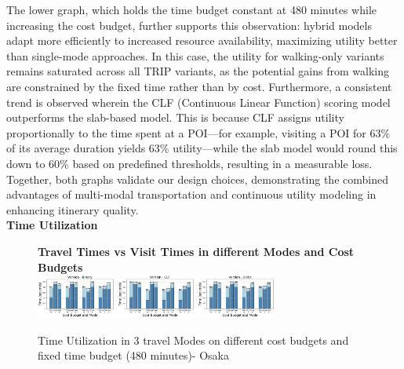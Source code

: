The lower graph, which holds the time budget constant at 480 minutes while increasing the cost budget, further supports this observation: hybrid models adapt more efficiently to increased resource availability, maximizing utility better than single-mode approaches. In this case, the utility for walking-only variants remains saturated across all TRIP variants, as the potential gains from walking are constrained by the fixed time rather than by cost. Furthermore, a consistent trend is observed wherein the CLF (Continuous Linear Function) scoring model outperforms the slab-based model. This is because CLF assigns utility proportionally to the time spent at a POI—for example, visiting a POI for 63\% of its average duration yields 63\% utility—while the slab model would round this down to 60\% based on predefined thresholds, resulting in a measurable loss. Together, both graphs validate our design choices, demonstrating the combined advantages of multi-modal transportation and continuous utility modeling in enhancing itinerary quality.\\

\noindent\textbf{Time Utilization}
\begin{figure}[th]
\textbf{Travel Times vs Visit Times in different Modes and Cost Budgets}\\
\includegraphics[width=0.23\textwidth]{plots/TIME_UTILIZATION_BINARY.png}
\includegraphics[width=0.23\textwidth]{plots/TIME_UTILIZATION_CLF.png}
\includegraphics[width=0.23\textwidth]{plots/TIME_UTILIZATION_SLABS.png}
\hspace{8pt}
\caption{Time Utilization in 3 travel Modes on different cost budgets and fixed time budget (480 minutes)- Osaka}
\label{fig:TimeUtilization}
\end{figure}

